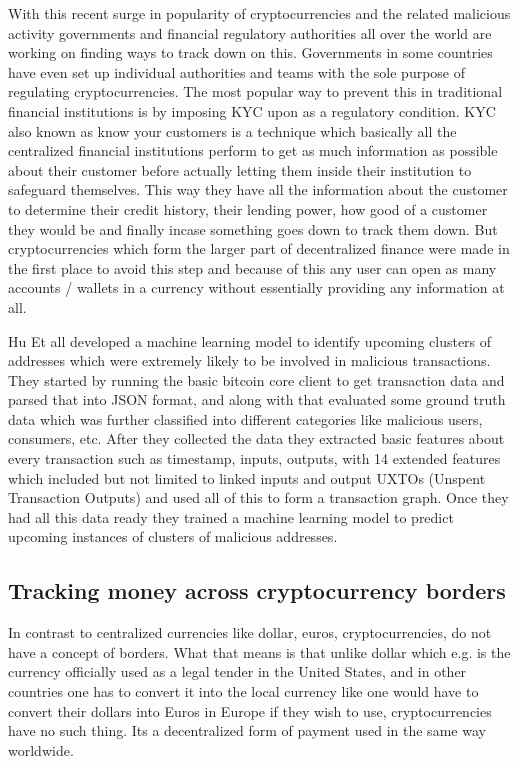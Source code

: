 \documentclass{article}
\begin{document}
        With this recent surge in popularity of cryptocurrencies and the related malicious activity governments and financial regulatory authorities all over the world are working on finding ways to track down on this. Governments in some countries have even set up individual authorities and teams with the sole purpose of regulating cryptocurrencies. The most popular way to prevent this in traditional financial institutions is by imposing KYC upon as a regulatory condition. KYC also known as know your customers is a technique which basically all the centralized financial institutions perform to get as much information as possible about their customer before actually letting them inside their institution to safeguard themselves. This way they have all the information about the customer to determine their credit history, their lending power, how good of a customer they would be and finally incase something goes down to track them down. But cryptocurrencies which form the larger part of decentralized finance were made in the first place to avoid this step and because of this any user can open as many accounts / wallets in a currency without essentially providing any information at all.
        
        Hu Et all\cite{hu2019characterizing} developed a machine learning model to identify upcoming clusters of addresses which were extremely likely to be involved in malicious transactions. They started by running the basic bitcoin core client to get transaction data and parsed that into JSON format, and along with that evaluated some ground truth data which was further classified into different categories like malicious users, consumers, etc. After they collected the data they extracted basic features about every transaction such as timestamp, inputs, outputs, with 14 extended features which included but not limited to  linked inputs and output UXTOs (Unspent Transaction Outputs) and used all of this to form a transaction graph. Once they had all this data ready they trained a machine learning model to predict upcoming instances of clusters of malicious addresses.

\pagebreak

    \subsection{Tracking money across cryptocurrency borders}
        In contrast to centralized currencies like dollar, euros, cryptocurrencies, do not have a concept of borders. What that means is that unlike dollar which e.g. is the currency officially used as a legal tender in the United States, and in other countries one has to convert it into the local currency like one would have to convert their dollars into Euros in Europe if they wish to use, cryptocurrencies have no such thing. Its a decentralized form of payment used in the same way worldwide. 
\end{document}

